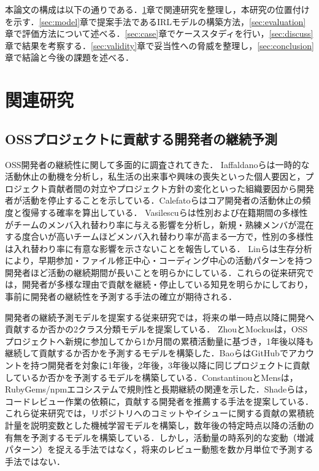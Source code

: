 \documentclass[submit,noauthor,ses,dvipdfmx]{ipsj}
\newcommand{\todo}[1]{\colorbox{yellow}{{\bf TODO}:}{\color{red} {\textbf{[#1]}}}}
\begin{document}
本論文の構成は以下の通りである．\ref{sec:RelaatedWork}章で関連研究を整理し，本研究の位置付けを示す．\ref{sec:model}章で提案手法であるIRLモデルの構築方法，\ref{sec:evaluation}章で評価方法について述べる．\ref{sec:case}章でケーススタディを行い，\ref{sec:discuss}章で結果を考察する．\ref{sec:validity}章で妥当性への脅威を整理し，\ref{sec:conclusion}章で結論と今後の課題を述べる．

\section{関連研究}\label{sec:RelaatedWork}

\subsection{OSSプロジェクトに貢献する開発者の継続予測}
OSS開発者の継続性に関して多面的に調査されてきた．
Iaffaldanoらは一時的な活動休止の動機を分析し，私生活の出来事や興味の喪失といった個人要因と，プロジェクト貢献者間の対立やプロジェクト方針の変化といった組織要因から開発者が活動を停止することを示している\cite{iaffaldano}．Calefatoらはコア開発者の活動休止の頻度と復帰する確率を算出している\cite{calefato}．
Vasilescuらは性別および在籍期間の多様性がチームのメンバ入れ替わり率に与える影響を分析し，新規・熟練メンバが混在する度合いが高いチームほどメンバ入れ替わり率が高まる一方で，性別の多様性は入れ替わり率に有意な影響を示さないことを報告している\cite{vasilescu}．
Linらは生存分析により，早期参加・ファイル修正中心・コーディング中心の活動パターンを持つ開発者ほど活動の継続期間が長いことを明らかにしている\cite{lin}．これらの従来研究では，開発者が多様な理由で貢献を継続・停止している知見を明らかにしており，事前に開発者の継続性を予測する手法の確立が期待される．

開発者の継続予測モデルを提案する従来研究では，将来の単一時点以降に開発へ貢献するか否かの2クラス分類モデルを提案している．
ZhouとMockusは，OSSプロジェクトへ新規に参加してから1か月間の累積活動量に基づき，1年後以降も継続して貢献するか否かを予測するモデルを構築した\cite{zhou}．BaoらはGitHubでアカウントを持つ開発者を対象に1年後，2年後，3年後以降に同じプロジェクトに貢献しているか否かを予測するモデルを構築している\cite{bao}．ConstantinouとMensは，RubyGems/npmエコシステムで規則性と長期継続の関連を示した\cite{constantinou}．Shadeらは，コードレビュー作業の依頼に，貢献する開発者を推薦する手法を提案している\cite{shade}．
これら従来研究では，リポジトリへのコミットやイシューに関する貢献の累積統計量を説明変数とした機械学習モデルを構築し，数年後の特定時点以降の活動の有無を予測するモデルを構築している．しかし，活動量の時系列的な変動（増減パターン）を捉える手法ではなく，将来のレビュー動態を数か月単位で予測する手法ではない．
\end{document}

